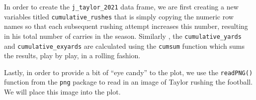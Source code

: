 \documentclass[
  letterpaper,
]{krantz}
\newenvironment{Shaded}{\begin{snugshade}}{\end{snugshade}}
\newcommand{\AttributeTok}[1]{\textcolor[rgb]{0.40,0.45,0.13}{#1}}
\newcommand{\DecValTok}[1]{\textcolor[rgb]{0.68,0.00,0.00}{#1}}
\newcommand{\FunctionTok}[1]{\textcolor[rgb]{0.28,0.35,0.67}{#1}}
\newcommand{\NormalTok}[1]{\textcolor[rgb]{0.00,0.23,0.31}{#1}}
\newcommand{\OtherTok}[1]{\textcolor[rgb]{0.00,0.23,0.31}{#1}}
\newcommand{\SpecialCharTok}[1]{\textcolor[rgb]{0.37,0.37,0.37}{#1}}
\newcommand{\StringTok}[1]{\textcolor[rgb]{0.13,0.47,0.30}{#1}}
\begin{document}
\begin{Shaded}
\end{Shaded}

In order to create the \texttt{j\_taylor\_2021} data frame, we are first
creating a new variables titled \texttt{cumulative\_rushes} that is
simply copying the numeric row names so that each subsequent rushing
attempt increases this number, resulting in his total number of carries
in the season. Similarly , the \texttt{cumulative\_yards} and
\texttt{cumulative\_exyards} are calculated using the \texttt{cumsum}
function which sums the results, play by play, in a rolling fashion.

Lastly, in order to provide a bit of ``eye candy'' to the plot, we use
the \texttt{readPNG()} function from the \texttt{png} package to read in
an image of Taylor rushing the football. We will place this image into
the plot.
\end{document}
